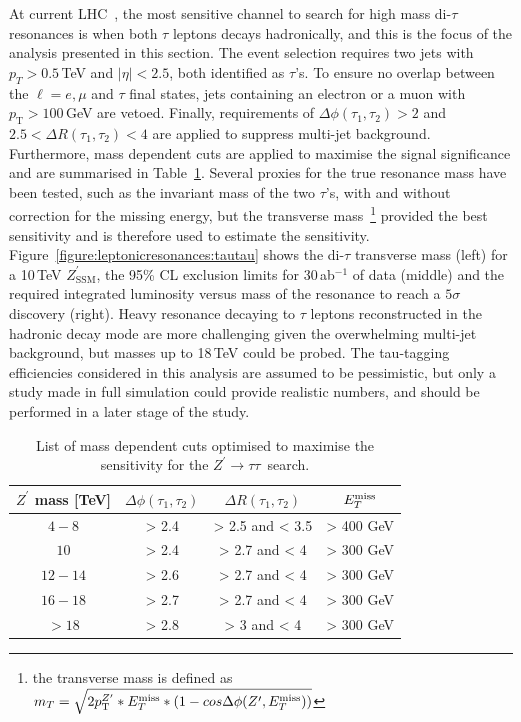 \documentclass[a4paper,11pt]{article}
\newcommand{\Zp}{\ensuremath{Z^{\prime}}}
\newcommand{\ZpSSM}{\ensuremath{Z^{\prime}_{\mathrm{SSM}}}}
\newcommand*{\Zptata}{\ensuremath{Z^{\prime}\rightarrow \tau\tau}}
\newcommand{\pt}{\ensuremath{p_{\text{T}}}}
\newcommand{\ptZp}{\ensuremath{p_{\text{T}}^{\ensuremath{Z^{\prime}}}}}
\newcommand*{\met}{\ensuremath{E_{T}^{\rm{miss}}}}
\begin{document}
At current LHC~\cite{Khachatryan:2016qkc}, the most sensitive channel to search for high mass di-$\tau$ resonances is when both $\tau$ leptons decays hadronically, and this is the focus of the analysis presented in this section. The event selection requires two jets with $p_{T} > 0.5$\,TeV and $|\eta|<2.5$, both identified as $\tau$'s. To ensure no overlap between the $\ell=e,\mu$ and $\tau$ final states, jets containing an electron or a muon with $\pt > 100$\,GeV are vetoed. Finally, requirements of $\Delta \phi(\tau_1, \tau_2)> 2$ and $2.5<\Delta R(\tau_1, \tau_2)<4$ are applied to suppress multi-jet background. Furthermore, mass dependent cuts are applied to maximise the signal significance and are summarised in Table~\ref{tab:leptonicresonances:tautau}. Several proxies for the true resonance mass have been tested, such as the invariant mass of the two $\tau$'s, with and without correction for the missing energy, but the transverse mass~\footnote{the transverse mass is defined as $m_{T}  =  \sqrt{2\ptZp*\met*(1-cos\Delta\phi(\Zp,\met))} $} provided the best sensitivity and is therefore used to estimate the sensitivity.
Figure~\ref{figure:leptonicresonances:tautau} shows the di-$\tau$ transverse mass (left) for a 10\,TeV \ZpSSM, the 95\% CL exclusion limits for 30\,ab$^{-1}$ of data (middle) and the required integrated luminosity versus mass of the resonance to reach a $5\sigma$ discovery (right). Heavy resonance decaying to $\tau$ leptons reconstructed in the hadronic decay mode are more challenging given the overwhelming multi-jet background, but masses up to 18\,TeV could be probed. The tau-tagging efficiencies considered in this analysis are assumed to be pessimistic, but only a study made in full simulation could provide realistic numbers, and should be performed in a later stage of the study.

\begin{table}[htb!]
   \centering
\begin{tabular}{c|c|c|c}
   $\Zp$ mass [TeV] &  $\Delta \phi(\tau_1, \tau_2)$&  $\Delta R(\tau_1, \tau_2)$ & $\met$\\
  \hline
  \hline
  $4-8$ & > 2.4 & > 2.5 and < 3.5 & > 400 GeV\\
  $10$ & > 2.4 & > 2.7 and < 4 & > 300 GeV\\
  $12-14$ & > 2.6 & > 2.7 and < 4 & > 300 GeV\\
  $16-18$ & > 2.7 & > 2.7 and < 4 & > 300 GeV\\
  $>18$ & > 2.8 & > 3 and < 4 & > 300 GeV\\
  \end{tabular}
  \caption{List of mass dependent cuts optimised to maximise the sensitivity for the \Zptata\ search.}
  \label{tab:leptonicresonances:tautau}
\end{table}
\end{document}
